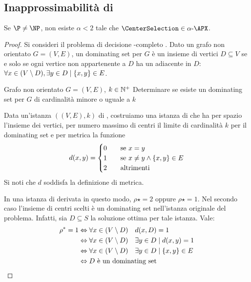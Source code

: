 \subsection{Inapprossimabilità di \CenterSelection}
\begin{theorem}
	Se $\P\neq\NP$, non esiste $\alpha<2$ tale che $\CenterSelection\in\gAPX\alpha$.
\end{theorem}
\begin{proof}
	Si consideri il problema di decisione \NP-completo \DominatingSet. Dato un grafo non orientato $G=(V,E)$, un dominating set per $G$ è un insieme di vertici $D\subseteq V$ se e solo se ogni vertice non appartenente a $D$ ha un adiacente in $D$: $\forall x\in(V\setminus D),\exists y\in D\mid \left\{ x,y \right\}\in E$.

	\pdec{\DominatingSet}
	{Grafo non orientato $G=(V,E)$, $k\in\mathbb N^+$}
	{Determinare se esiste un dominating set per $G$ di cardinalità minore o uguale a $k$}

	Data un'istanza $((V,E),k)$ di \DominatingSet, costruiamo una istanza di \CenterSelection che ha per spazio l'insieme dei vertici, per numero massimo di centri il limite di cardinalità $k$ per il dominating set e per metrica la funzione
	\begin{equation*}
		d(x,y) =
		\begin{cases}
			0 \quad & \text{se } x = y                      \\
			1 \quad & \text{se } x\neq y\land\left\{ x,y \right\}\in E \\
			2 \quad & \text{altrimenti}
		\end{cases}
	\end{equation*}
	Si noti che $d$ soddisfa la definizione di metrica.

	In una istanza di \CenterSelection derivata in questo modo, $\rho\star=2$ oppure $\rho\star=1$.
	Nel secondo caso l'insieme di centri scelti è un dominating set nell'istanza originale del problema.
	Infatti, sia $D\subseteq S$ la soluzione ottima per tale istanza. Vale:
	\begin{align*}
		\rho^*=1 & \Leftrightarrow\forall x\in(V\setminus D)\quad d(x,D)=1                             \\
		            & \Leftrightarrow\forall x \in (V \setminus D)\quad \exists y\in D\mid d(x,y)=1       \\
		            & \Leftrightarrow\forall x \in (V \setminus D)\quad \exists y\in D\mid \left\{ x,y \right\}\in E \\
		            & \Leftrightarrow D\text{ è un dominating set}
	\end{align*}


\end{proof}
